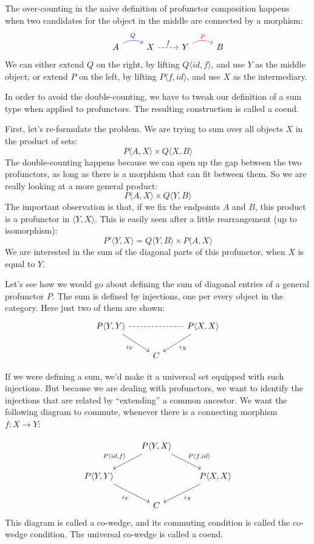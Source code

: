 \documentclass[DaoFP]{subfiles}
\begin{document}
The over-counting in the naive definition of profunctor composition happens when two candidates for the object in the middle are connected by a morphism:
\[
 \begin{tikzcd}
  & A
  \arrow[r, bend left, blue, "Q"]
  &X
  \arrow[r, dashed, "f"]
 & Y
  \arrow[r, bend left, red, "P"]
 & B
  \end{tikzcd}
\]
We can either extend $Q$ on the right, by lifting $Q \langle id, f \rangle$, and use $Y$ as the middle object; or extend $P$ on the left, by lifting $P \langle f, id \rangle$, and use $X$ as the intermediary.

In order to avoid the double-counting, we have to tweak our definition of a sum type when applied to profunctors. The resulting construction is called a coend. 

First, let's re-formulate the problem. We are trying to sum over all objects $X$ in the product of sets:
\[ P \langle A, X \rangle \times Q \langle X, B \rangle \]
The double-counting happens because we can open up the gap between the two profunctors, as long as there is a morphism that can fit between them. So we are really looking at a more general product:
\[ P \langle A, X \rangle \times Q \langle Y, B \rangle \]
The important observation is that, if we fix the endpoints $A$ and $B$, this product is a profunctor in $\langle Y, X \rangle$. This is easily seen after a little rearrangement (up to isomorphism):
\[P' \langle Y, X \rangle = Q \langle Y, B \rangle \times P \langle A, X \rangle \]
We are interested in the sum of the diagonal parts of this profunctor, when $X$ is equal to $Y$. 

Let's see how we would go about defining the sum of diagonal entries of a general profunctor $P$. The sum is defined by injections, one per every object in the category. Here just two of them are shown:
\[
 \begin{tikzcd}
 P \langle Y, Y \rangle
 \arrow[dr, "i_Y"']
 \arrow[rr, dash, dashed]
 &&P \langle X, X \rangle
 \arrow[dl, "i_X"]
 \\
 &C
 \end{tikzcd}
\]

If we were defining a sum, we'd make it a universal set equipped with such injections. But because we are dealing with profunctors, we want to identify the injections that are related by ``extending'' a common ancestor. We want the following diagram to commute, whenever there is a connecting morphism $f\colon X \to Y$:

\[
 \begin{tikzcd}
 &P \langle Y, X \rangle
 \arrow[ld, "{P \langle id, f \rangle}"']
 \arrow[rd, "{P \langle f, id \rangle}"]
 \\
 P \langle Y, Y \rangle
 \arrow[dr, "i_Y"']
 &&P \langle X, X \rangle
 \arrow[dl, "i_X"]
 \\
 &C
 \end{tikzcd}
\]
This diagram is called a co-wedge, and its commuting condition is called the co-wedge condition. The universal co-wedge is called a coend.
\end{document}
